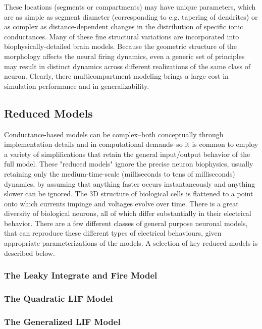 These locations (segments or compartments) may have unique parameters, which are as simple as segment diameter (corresponding to e.g. tapering of dendrites) or as complex as distance-dependent changes in the distribution of specific ionic conductances.
Many of these fine structural variations are incorporated into biophysically-detailed brain models.  
Because the geometric structure of the morphology affects the neural firing dynamics, even a generic set of principles may result in distinct dynamics across different realizations of the same class of neuron.  
Clearly, there multicompartment modeling brings a large cost in simulation performance and in generalizability.

\subsection{Reduced Models}
Conductance-based models can be complex--both conceptually through implementation details and in computational demands--so it is common to employ a variety of simplifications that retain the general input/output behavior of the full model.
These "reduced models" ignore the precise neuron biophysics, usually retaining only the medium-time-scale (milliseconds to tens of milliseconds) dynamics, by assuming that anything faster occurs instantaneously and anything slower can be ignored.
The 3D structure of biological cells is flattened to a point onto which currents impinge and voltages evolve over time. There is a great diversity of biological neurons, all of which differ substantially in their electrical behavior. There are a few different classes of general purpose neuronal models, that can reproduce these different types of electrical behaviours, given appropriate parameterizations of the models. A selection of key reduced models is described below.
\subsubsection{The Leaky Integrate and Fire Model}
\subsubsection{The Quadratic LIF Model}
\subsubsection{The Generalized LIF Model}

